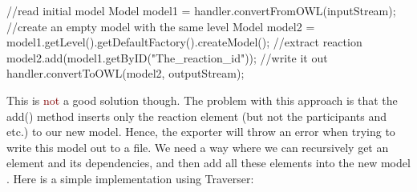 \documentclass{tufte-book}
\newcommand{\hlred}[1]{\textcolor{Maroon}{#1}}%
\begin{document}
\begin{javacode}
  //read initial model
  Model model1 = handler.convertFromOWL(inputStream);
  //create an empty model with the same level
  Model model2 = 
   model1.getLevel().getDefaultFactory().createModel();
  //extract reaction
  model2.add(model1.getByID("The_reaction_id"));
  //write it out
  handler.convertToOWL(model2, outputStream);
\end{javacode}

This is \hlred{not} a good solution though. The problem with this approach is that the add() method inserts only the reaction element (but not the participants and etc.) to our new model.  Hence, the exporter will throw an error when trying to write this model out to a file. We need a way where we can recursively get an element and its dependencies, and then add all these elements into the new model . Here is a simple implementation using Traverser:
\end{document}
